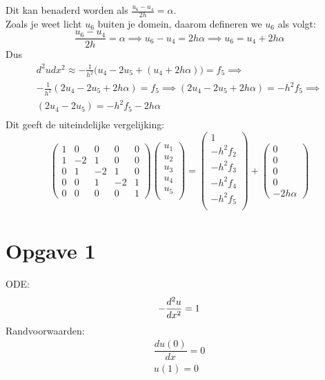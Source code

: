 \documentclass[11pt]{article}
\begin{document}
Dit kan benaderd worden als
$\frac{u_{6}-u_{4}}{2h} = \alpha$.\\
Zoals je weet licht $u_{6}$ buiten je domein, daarom defineren we $u_{6}$ als volgt:\\
$$
\frac{u_{6}-u_{4}}{2h} = \alpha \implies u_{6}-u_{4} = 2h\alpha \implies u_{6} = u_{4} + 2h\alpha
$$
Dus\\
\begin{gather*}
{d^2u}{dx^2} \approx -\frac{1}{h^2}\big(u_{4}-2u_{5}+(u_{4} + 2h\alpha)\big) = f_{5} \implies\\
-\frac{1}{h^2}(2u_{4}-2u_{5}+ 2h\alpha) = f_{5}
\implies (2u_{4}-2u_{5}+ 2h\alpha) = -h^2f_{5} \implies\\
(2u_{4}-2u_{5}) = -h^2f_{5} - 2h\alpha\\
\end{gather*}
Dit geeft de uiteindelijke vergelijking:\\
$$
\begin{pmatrix}
1 & 0 & 0 & 0 & 0 \\
1 & -2& 1 & 0 & 0 \\
0 & 1 & -2& 1 & 0 \\
0 & 0 & 1 & -2& 1 \\
0 & 0 & 0 & 0 & 1 
\end{pmatrix}
%
\begin{pmatrix}
u_{1}\\
u_{2}\\
u_{3}\\
u_{4}\\
u_{5}\\
\end{pmatrix}
=
\begin{pmatrix}
1\\
-h^2f_{2}\\
-h^2f_{3}\\
-h^2f_{4}\\
-h^2f_{5}\\
\end{pmatrix}
+
\begin{pmatrix}
0\\
0\\
0\\
0\\
-2h\alpha
\end{pmatrix}
$$


\section{Opgave 1}
ODE:\\
$$
-\dfrac{d^2u}{dx^2} = 1\\\\
$$
Randvoorwaarden:\\
\begin{align*}
	\dfrac{du(0)}{dx} = 0 \\
				 u(1) = 0
\end{align*}
\end{document}
